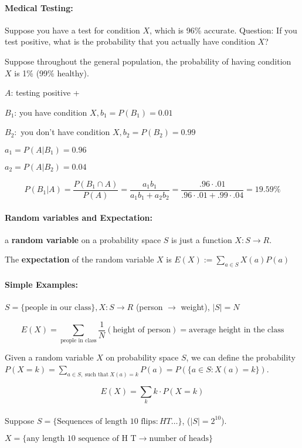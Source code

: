 \documentclass[a4paper, 11pt, twoside]{article}
\begin{document}
\paragraph{Medical Testing:} Suppose you have a test for condition $X$, which is 96\% accurate. Question: If you test positive, what is the probability that you actually have condition $X$?

Suppose throughout the general population, the probability of having condition $X$ is 1\% (99\% healthy).

$A$: testing positive +

$B_1$: you have condition $X, b_1=P(B_1)=0.01$

$B_2:$ you don't have condition $X, b_2=P(B_2)=0.99$

$a_1=P(A|B_1)=0.96$

$a_2=P(A|B_2)=0.04$

\[P(B_1|A)=\frac{P(B_1\cap A)}{P(A)}=\frac{a_1b_1}{a_1b_1+a_2b_2}=\frac{.96\cdot .01}{.96\cdot .01 + .99\cdot .04}=19.59\%\]

\paragraph{Random variables and Expectation:} a \textbf{random variable} on a probability space $S$ is just a function $X: S\rightarrow R$.

The \textbf{expectation} of the random variable $X$ is $E(X):=\sum_{a\in S}X(a)P(a)$

\paragraph{Simple Examples:}

$S=\{\text{people in our class}\}, X:S\rightarrow R$ (person $\rightarrow$ weight), $|S|=N$

\[E(X)=\sum_{\text{people in class}}\frac1{N}{(\text{height of person})}=\text{average height in the class}\]

Given a random variable $X$ on probability space $S$, we can define the probability $P(X=k)=\sum_{a\in S,\ \text{such that}\ X(a)=k}P(a)=P(\{a\in S: X(a)=k\})$.

\[E(X)=\sum_k k\cdot P(X=k)\]\\

Suppose $S=\{\text{Sequences of length 10 flips}: HT\dots\}$, ($|S|=2^{10}$).

$X=\{\text{any length 10 sequence of H T}\rightarrow \text{number of heads}\}$
\end{document}
